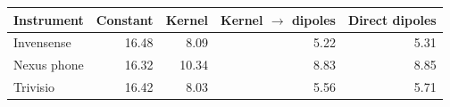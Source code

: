 \begin{tabular}{@{}lrrrr@{}}
\toprule
Instrument & Constant & Kernel & Kernel $\to$ dipoles & Direct dipoles \\
\midrule
Invensense & 16.48 & 8.09 & 5.22 & 5.31 \\
Nexus phone & 16.32 & 10.34 & 8.83 & 8.85 \\
Trivisio & 16.42 & 8.03 & 5.56 & 5.71 \\
\bottomrule
\end{tabular}

